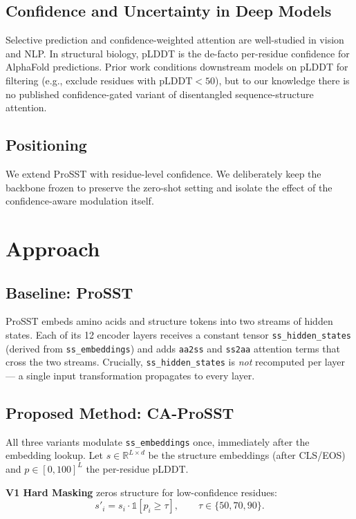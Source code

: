 \documentclass[11pt,a4paper]{article}
\begin{document}
\subsection{Confidence and Uncertainty in Deep Models}
Selective prediction and confidence-weighted attention are well-studied in
vision and NLP. In structural biology, pLDDT is the de-facto per-residue
confidence for AlphaFold predictions. Prior work conditions downstream
models on pLDDT for filtering (e.g., exclude residues with
$\text{pLDDT}{<}50$), but to our knowledge there is no published
confidence-gated variant of disentangled sequence-structure attention.

\subsection{Positioning}
We extend ProSST with residue-level confidence. We deliberately keep the
backbone frozen to preserve the zero-shot setting and isolate the effect
of the confidence-aware modulation itself.

\section{Approach}

\subsection{Baseline: ProSST}
ProSST embeds amino acids and structure tokens into two streams of hidden
states. Each of its 12 encoder layers receives a constant tensor
\texttt{ss\_hidden\_states} (derived from \texttt{ss\_embeddings}) and adds
\texttt{aa2ss} and \texttt{ss2aa} attention terms that cross the two streams.
Crucially, \texttt{ss\_hidden\_states} is \emph{not} recomputed per layer---
a single input transformation propagates to every layer.

\subsection{Proposed Method: CA-ProSST}
All three variants modulate \texttt{ss\_embeddings} once, immediately after
the embedding lookup. Let $s \in \mathbb{R}^{L \times d}$ be the
structure embeddings (after CLS/EOS) and $p \in [0,100]^{L}$ the per-residue
pLDDT.

\textbf{V1 Hard Masking} zeros structure for low-confidence residues:
\begin{equation}
s'_i = s_i \cdot \mathbb{1}[p_i \geq \tau], \qquad \tau \in \{50, 70, 90\}.
\end{equation}
\end{document}
